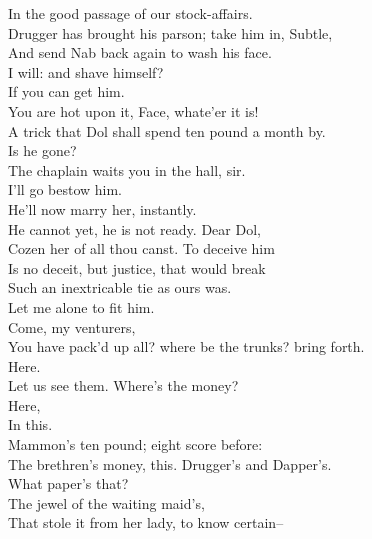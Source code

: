 \documentclass{memoir}
\begin{document}
\begin{drama*}
 In the good passage of our stock-affairs.\\
\facespeaks  Drugger has brought his parson; take him in, Subtle,\\
 And send Nab back again to wash his face.\\
\subtlespeaks  I will: and shave himself?\\
\facespeaks {} If you can get him.\\
\dolspeaks  You are hot upon it, Face, whate'er it is!\\
\facespeaks  A trick that Dol shall spend ten pound a month by.\\
 Is he gone?\\
\subtlespeaks {} The chaplain waits you in the hall, sir.\\
\facespeaks  I'll go bestow him.\\
\dolspeaks {} He'll now marry her, instantly.\\
\subtlespeaks  He cannot yet, he is not ready. Dear Dol,\\
 Cozen her of all thou canst. To deceive him\\
 Is no deceit, but justice, that would break\\
 Such an inextricable tie as ours was.\\
\dolspeaks  Let me alone to fit him.\\
\facespeaks {} Come, my venturers,\\
 You have pack'd up all? where be the trunks? bring forth.\\
\subtlespeaks  Here.\\
\facespeaks {} Let us see them. Where's the money?\\
\subtlespeaks {} Here,\\
 In this.\\
\facespeaks {} Mammon's ten pound; eight score before:\\
 The brethren's money, this. Drugger's and Dapper's.\\
 What paper's that?\\
\dolspeaks {} The jewel of the waiting maid's,\\
 That stole it from her lady, to know certain--\\

\end{drama*}
\end{document}
